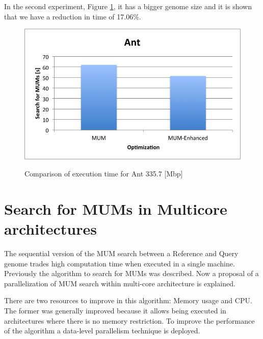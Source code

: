 \documentclass[conference]{IEEEtran}
\begin{document}
In the second experiment, Figure \ref{s2}, it has a bigger genome size and it is shown that we have a reduction in time of 17.06\%.
\begin{figure}[hbtp]
\caption{Comparison of execution time for Ant 335.7 [Mbp]}
\centering
\includegraphics[scale=0.5]{serial2.png}
\label{s2}
\end{figure}

\section{Search for MUMs in Multicore architectures}
\label{multicore}
The sequential version of the MUM search between a Reference and Query genome trades high computation time when executed in a single machine. Previously the algorithm to search for MUMs was described. Now a proposal of a parallelization of MUM search within multi-core architecture is explained.

There are two resources to improve in this algorithm: Memory usage and CPU. The former was generally improved because it allows being executed in architectures where there is no memory restriction. To improve the performance of the algorithm a data-level parallelism technique is deployed.
\end{document}

